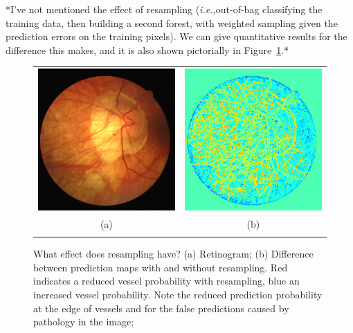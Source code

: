 \documentclass{IEEEtran}
\def\ie{\emph{i.e.,}}
\newcommand{\fref}[1]{Figure~\ref{#1}}
\begin{document}
*I've not mentioned the effect of resampling (\ie out-of-bag classifying the training data, then building a second forest, with weighted sampling given the prediction errors on the training pixels). We can give quantitative results for the difference this makes, and it is also shown pictorially in \fref{f:drive_resampling}.*
%
\begin{figure}[t]
\centering
\begin{tabular}{@{}c c@{}} %
\includegraphics[width=0.48\columnwidth]{figs/retina/34_DRIVE_ret} &
\includegraphics[width=0.48\columnwidth]{figs/retina/34_resampling_difference} \\
(a) & (b) \\
\noalign{\smallskip}
\end{tabular}
%
\caption{What effect does resampling have? %
(a) Retinogram; %
(b) Difference between prediction maps with and without resampling. Red indicates a reduced vessel probability with resampling, blue an increased vessel probability. Note the reduced prediction probability at the edge of vessels and for the false predictions caused by pathology in the image; %
}
\label{f:drive_resampling}
\end{figure}
%
\end{document}
